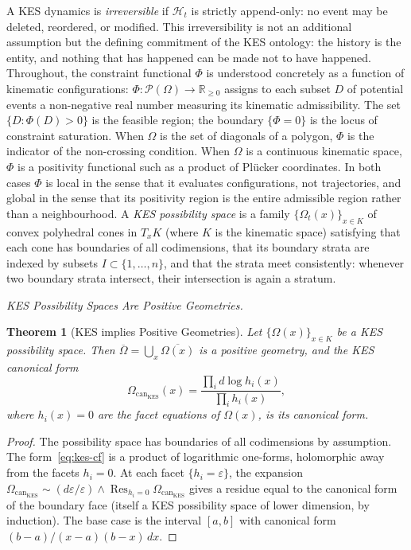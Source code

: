 \documentclass[11pt]{article}
\theoremstyle{plain}
\newtheorem{theorem}{Theorem}[section]
\theoremstyle{definition}
\theoremstyle{remark}
\DeclareMathOperator{\Res}{Res}
\newcommand{\R}{\mathbb{R}}
\newcommand{\eps}{\varepsilon}
\newcommand{\Phif}{\Phi}
\newcommand{\OmKS}{\Omega}
\newcommand{\HKS}{\mathcal{H}}
\newcommand{\CF}{\Omega_{\mathrm{can}}}
\begin{document}
A KES dynamics is \emph{irreversible} if $\HKS_t$ is strictly append-only: no event may be deleted, reordered, or modified. This irreversibility is not an additional assumption but the defining commitment of the KES ontology: the history is the entity, and nothing that has happened can be made not to have happened. Throughout, the constraint functional $\Phif$ is understood concretely as a function of kinematic configurations: $\Phif: \mathcal{P}(\OmKS) \to \R_{\geq 0}$ assigns to each subset $D$ of potential events a non-negative real number measuring its kinematic admissibility. The set $\{D : \Phif(D) > 0\}$ is the feasible region; the boundary $\{\Phif = 0\}$ is the locus of constraint saturation. When $\OmKS$ is the set of diagonals of a polygon, $\Phif$ is the indicator of the non-crossing condition. When $\OmKS$ is a continuous kinematic space, $\Phif$ is a positivity functional such as a product of Pl\"{u}cker coordinates. In both cases $\Phif$ is local in the sense that it evaluates configurations, not trajectories, and global in the sense that its positivity region is the entire admissible region rather than a neighbourhood. A \emph{KES possibility space} is a family $\{\OmKS_t(x)\}_{x \in K}$ of convex polyhedral cones in $T_x K$ (where $K$ is the kinematic space) satisfying that each cone has boundaries of all codimensions, that its boundary strata are indexed by subsets $I \subset \{1,\ldots,n\}$, and that the strata meet consistently: whenever two boundary strata intersect, their intersection is again a stratum.

\medskip\noindent\textit{KES Possibility Spaces Are Positive Geometries.}

\begin{theorem}[KES implies Positive Geometries]
\label{thm:kes-pg}
Let $\{\OmKS(x)\}_{x \in K}$ be a KES possibility space. Then $\overline{\OmKS} = \bigcup_{x} \overline{\OmKS(x)}$ is a positive geometry, and the KES canonical form
\begin{equation}
\label{eq:kes-cf}
  \CF_{\mathrm{KES}}(x) = \frac{\prod_i d\log h_i(x)}{\prod_i h_i(x)},
\end{equation}
where $h_i(x) = 0$ are the facet equations of $\OmKS(x)$, is its canonical form.
\end{theorem}

\begin{proof}
The possibility space has boundaries of all codimensions by assumption. The form~\eqref{eq:kes-cf} is a product of logarithmic one-forms, holomorphic away from the facets $h_i = 0$. At each facet $\{h_i = \eps\}$, the expansion $\CF_{\mathrm{KES}} \sim (d\eps/\eps) \wedge \Res_{h_i = 0}\CF_{\mathrm{KES}}$ gives a residue equal to the canonical form of the boundary face (itself a KES possibility space of lower dimension, by induction). The base case is the interval $[a,b]$ with canonical form $(b-a)/(x-a)(b-x) \, dx$.
\end{proof}
\end{document}
